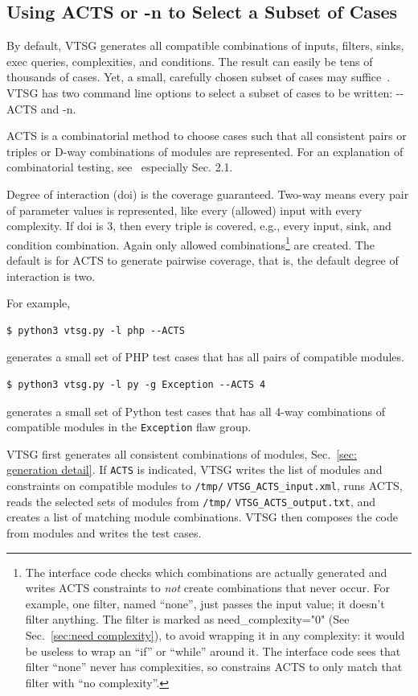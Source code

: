 \subsection{Using ACTS or -n to Select a Subset of Cases}
\label{sec:selecting cases}

By default, VTSG generates all compatible combinations of inputs, filters, sinks,
exec queries, complexities, and conditions.  The result can easily be tens of
thousands of cases.  Yet, a small, carefully chosen subset of cases may
suffice~\cite{SWInteractions2004}.  VTSG has two command line options to select a
subset of cases to be written: -\zws-ACTS and -n.

ACTS is a combinatorial method to choose cases such that all consistent
pairs or triples or D-way combinations of modules are represented.  For an
explanation of combinatorial testing, see~\cite{KuhnEtAl2010PracCT} especially
Sec. 2.1.

Degree of interaction (doi) is the coverage guaranteed.  Two-way means every
pair of parameter values is represented, like every (allowed) input with every
complexity.  If doi is 3, then every triple is covered, e.g., every input, sink,
and condition combination.  Again only allowed combinations\footnote{The
interface code checks which combinations are actually generated and
writes ACTS constraints to \emph{not} create combinations that never occur.
For example, one filter, named ``none'', just passes the input value; it
doesn't filter anything.  The filter is marked as need\_complexity="0" (See
Sec.~\ref{sec:need complexity}), to avoid wrapping it in any complexity: it
would be useless to wrap an ``if'' or ``while'' around it.
The interface code sees that
filter ``none'' never has complexities, so constrains ACTS to only match that
filter with ``no complexity''.
}
are created.  The default is for ACTS to generate pairwise coverage, that is,
the default degree of interaction is two.

For example,
\begin{verbatim}
$ python3 vtsg.py -l php --ACTS
\end{verbatim}
generates a small set of PHP test cases that has all pairs of compatible
modules.
\begin{verbatim}
$ python3 vtsg.py -l py -g Exception --ACTS 4
\end{verbatim}
generates a small set of Python test cases that has all 4-way combinations of
compatible modules in the \verb|Exception| flaw group.

VTSG first generates all consistent combinations of modules,
Sec.~\ref{sec: generation detail}.  If \verb|ACTS| is indicated, VTSG writes
the list of modules and constraints on compatible modules to
\verb|/tmp/| \verb|VTSG_ACTS_input.xml|, runs ACTS, reads the selected sets of modules
from \verb|/tmp/| \linebreak \verb|VTSG_ACTS_output.txt|,
and creates a list of matching module
combinations.  VTSG then composes the code from modules and writes the test
cases.

